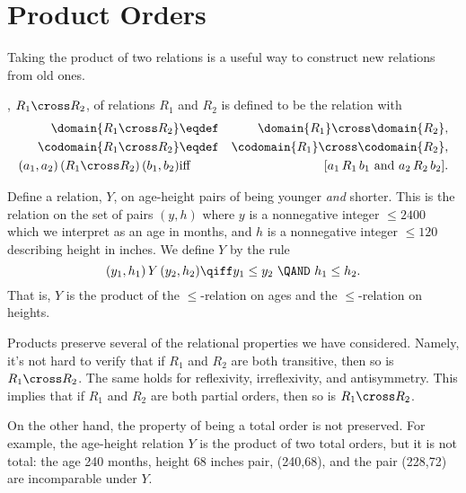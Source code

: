 

\section{Product Orders}\label{prodsec}

Taking the product of two relations is a useful way to construct new
relations from old ones.

\begin{definition}\label{productrel}
, $R_1 \cross R_2$, of relations
$R_1$ and $R_2$ is defined to be the relation with
\begin{eqnarray*}
\domain{R_1 \cross R_2} &\eqdef& \domain{R_1} \cross \domain{R_2},\\
\codomain{R_1 \cross R_2} &\eqdef& \codomain{R_1} \cross \codomain{R_2},\\
(a_1,a_2)\, (R_1 \cross R_2)\, (b_1,b_2) &\text{iff}& [a_1\, R_1\, b_1
\text{ and } a_2\, R_2\, b_2].
\end{eqnarray*}

\end{definition}

\begin{example}\label{Y}
Define a relation, $Y$, on age-height pairs of being younger \emph{and}
shorter.  This is the relation on the set of pairs $(y,h)$ where $y$ is a
nonnegative integer $\le 2400$ which we interpret as an age in months, and $h$
is a nonnegative integer $\le 120$ describing height in inches.  We define $Y$
by the rule
\[
(y_1,h_1)\, Y\, (y_2,h_2) \qiff y_1 \le y_2\ \QAND\ h_1 \le h_2.
\]
That is, $Y$ is the product of the $\le$-relation on ages and the
$\le$-relation on heights.
\end{example}

Products preserve several of the relational properties we have considered.
Namely, it's not hard to verify that if $R_1$ and $R_2$ are both
transitive, then so is $R_1 \cross R_2$.  The same holds for reflexivity,
irreflexivity, and antisymmetry.  This implies that if $R_1$ and $R_2$ are
both partial orders, then so is $R_1 \cross R_2$.

On the other hand, the property of being a total order is not preserved.
For example, the age-height relation $Y$ is the product of two total
orders, but it is not total: the age 240 months, height 68 inches pair,
(240,68), and the pair (228,72) are incomparable under $Y$.

